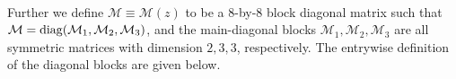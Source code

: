 \documentclass[12pt]{article}
\numberwithin{equation}{section}
\theoremstyle{remark}
\newcommand{\1}{{\rm 1}\kern-0.24em{\rm I}}
\begin{document}
\begin{appendices}
\begin{align}
 \end{align}
 
 Further we define  $\mathcal{M}\equiv\mathcal{M}(z) $ to be a $8$-by-$8$ block diagonal matrix such that $\mathcal{M}={\rm diag}(\mathcal{M}_1, \mathcal{M}_2, \mathcal{M}_3)$, and  the main-diagonal blocks $\mathcal{M}_1, \mathcal{M}_2, \mathcal{M}_3$ are all symmetric matrices with dimension $2,3,3$, respectively.  The entrywise definition of the diagonal blocks are given below.


\end{appendices}
\end{document}
